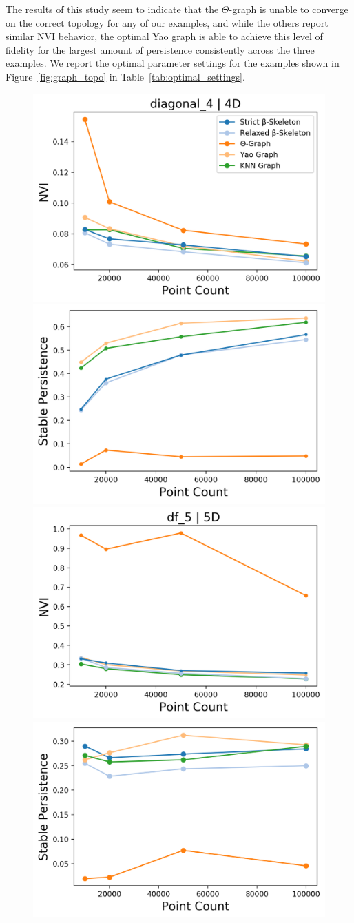 The results of this study seem to indicate that the $\Theta$-graph is unable to converge on the correct topology for any of our examples, and while the others report similar NVI behavior, the optimal Yao graph is able to achieve this level of fidelity for the largest amount of persistence consistently across the three examples.
%
We report the optimal parameter settings for the examples shown in Figure~\ref{fig:graph_topo} in Table~\ref{tab:optimal_settings}.

\begin{figure}[htbp]
    \includegraphics[width=0.48\linewidth]{figs/chap7/diagonal_4_nvi.png}
    \includegraphics[width=0.48\linewidth]{figs/chap7/diagonal_4_stability.png}
    \includegraphics[width=0.48\linewidth]{figs/chap7/df_5_5D_nvi.png}
    \includegraphics[width=0.48\linewidth]{figs/chap7/df_5_5D.png}

\end{figure}
